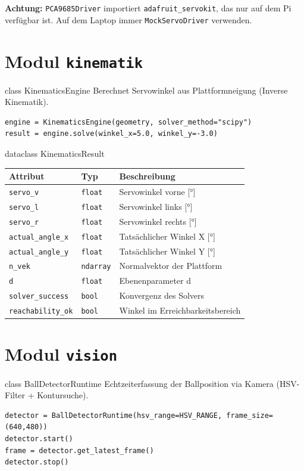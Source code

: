 \documentclass[11pt, a4paper]{scrartcl}
\newcommand{\apiparam}[3]{%
  \texttt{#1} & \texttt{\color{htbdark}#2} & #3 \\
}
\begin{document}
\begin{warnbox}
  \textbf{Achtung:} \texttt{PCA9685Driver} importiert \texttt{adafruit\_servokit},
  das nur auf dem Pi verfügbar ist. Auf dem Laptop immer \texttt{MockServoDriver}
  verwenden.
\end{warnbox}

\section{Modul \texttt{kinematik}}

\begin{apibox}{class KinematicsEngine}
  Berechnet Servowinkel aus Plattformneigung (Inverse Kinematik).

  \begin{lstlisting}[numbers=none]
engine = KinematicsEngine(geometry, solver_method="scipy")
result = engine.solve(winkel_x=5.0, winkel_y=-3.0)
  \end{lstlisting}
\end{apibox}

\begin{apibox}{dataclass KinematicsResult}
  \begin{tabular}{lll}
    \toprule
    Attribut & Typ & Beschreibung \\
    \midrule
    \apiparam{servo\_v}{float}{Servowinkel vorne [°]}
    \apiparam{servo\_l}{float}{Servowinkel links [°]}
    \apiparam{servo\_r}{float}{Servowinkel rechts [°]}
    \apiparam{actual\_angle\_x}{float}{Tatsächlicher Winkel X [°]}
    \apiparam{actual\_angle\_y}{float}{Tatsächlicher Winkel Y [°]}
    \apiparam{n\_vek}{ndarray}{Normalvektor der Plattform}
    \apiparam{d}{float}{Ebenenparameter d}
    \apiparam{solver\_success}{bool}{Konvergenz des Solvers}
    \apiparam{reachability\_ok}{bool}{Winkel im Erreichbarkeitsbereich}
    \bottomrule
  \end{tabular}
\end{apibox}

\section{Modul \texttt{vision}}

\begin{apibox}{class BallDetectorRuntime}
  Echtzeiterfassung der Ballposition via Kamera (HSV-Filter + Kontursuche).

  \begin{lstlisting}[numbers=none]
detector = BallDetectorRuntime(hsv_range=HSV_RANGE, frame_size=(640,480))
detector.start()
frame = detector.get_latest_frame()
detector.stop()
  \end{lstlisting}
\end{apibox}
\end{document}
